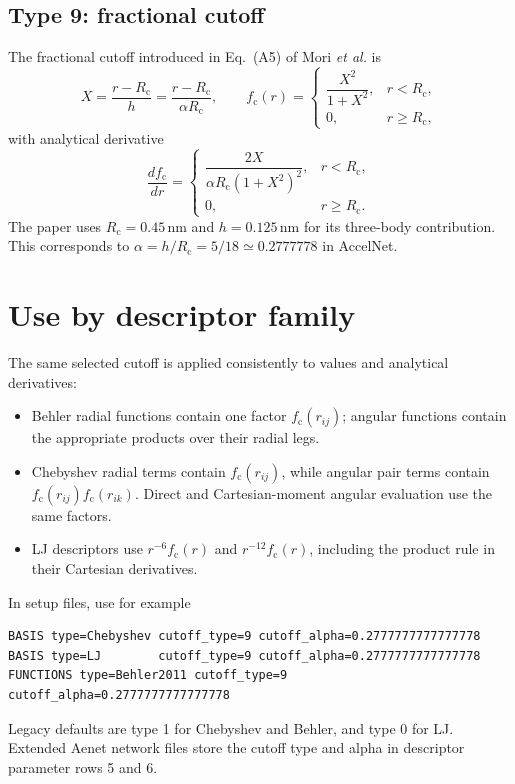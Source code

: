 \documentclass[11pt,a4paper]{article}
\newcommand{\rc}{R_{\mathrm c}}
\newcommand{\fc}{f_{\mathrm c}}
\begin{document}
\subsection*{Type 9: fractional cutoff}
The fractional cutoff introduced in Eq.~(A5) of Mori \emph{et al.} is
\begin{equation}
  X=\frac{r-\rc}{h}=\frac{r-\rc}{\alpha\rc},
  \qquad
  \fc(r)=
  \begin{cases}
    \dfrac{X^2}{1+X^2},&r<\rc,\\
    0,&r\geq\rc,
  \end{cases}
\end{equation}
with analytical derivative
\begin{equation}
  \frac{d\fc}{dr}=
  \begin{cases}
    \dfrac{2X}{\alpha\rc(1+X^2)^2},&r<\rc,\\
    0,&r\geq\rc.
  \end{cases}
\end{equation}
The paper uses $\rc=0.45\,\mathrm{nm}$ and $h=0.125\,\mathrm{nm}$ for its
three-body contribution.  This corresponds to
$\alpha=h/\rc=5/18\simeq0.2777778$ in AccelNet.

\section{Use by descriptor family}

The same selected cutoff is applied consistently to values and analytical
derivatives:
\begin{itemize}
  \item Behler radial functions contain one factor $\fc(r_{ij})$; angular
        functions contain the appropriate products over their radial legs.
  \item Chebyshev radial terms contain $\fc(r_{ij})$, while angular pair terms
        contain $\fc(r_{ij})\fc(r_{ik})$.  Direct and Cartesian-moment angular
        evaluation use the same factors.
  \item LJ descriptors use $r^{-6}\fc(r)$ and $r^{-12}\fc(r)$, including the
        product rule in their Cartesian derivatives.
\end{itemize}

In setup files, use for example
\begin{verbatim}
BASIS type=Chebyshev cutoff_type=9 cutoff_alpha=0.2777777777777778
BASIS type=LJ        cutoff_type=9 cutoff_alpha=0.2777777777777778
FUNCTIONS type=Behler2011 cutoff_type=9 cutoff_alpha=0.2777777777777778
\end{verbatim}
Legacy defaults are type 1 for Chebyshev and Behler, and type 0 for LJ.
Extended Aenet network files store the cutoff type and alpha in descriptor
parameter rows 5 and 6.
\end{document}
